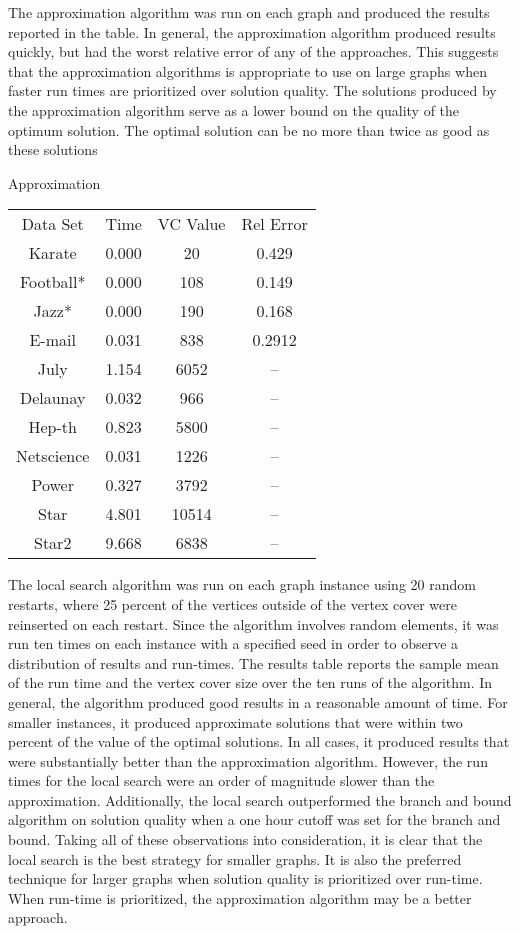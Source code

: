 \documentclass{sig-alternate-05-2015}
\begin{document}
The approximation algorithm was run on each graph and produced the results reported in the table. In general, the approximation algorithm produced results quickly, but had the worst relative error of any of the approaches. This suggests that the approximation algorithms is appropriate to use on large graphs when faster run times are prioritized over solution quality. The solutions produced by the approximation algorithm serve as a lower bound on the quality of the optimum solution. The optimal solution can be no more than twice as good as these solutions

\begin{center}
Approximation
\begin{tabular}{c c c c}
Data Set & Time & VC Value & Rel Error \\
Karate & 0.000 & 20 & 0.429 \\
Football* & 0.000 & 108 & 0.149 \\
Jazz* & 0.000 & 190 & 0.168 \\
E-mail & 0.031 & 838 & 0.2912 \\
July & 1.154 & 6052 & -- \\
Delaunay & 0.032 & 966 & -- \\
Hep-th & 0.823 & 5800 & -- \\
Netscience & 0.031 & 1226 & -- \\
Power & 0.327 & 3792 & -- \\
Star & 4.801 & 10514 & -- \\
Star2 & 9.668 & 6838 & -- \\
\end{tabular}
\end{center}

The local search algorithm was run on each graph instance using 20 random restarts, where 25 percent of the vertices outside of the vertex cover were reinserted on each restart. Since the algorithm involves random elements, it was run ten times on each instance with a specified seed in order to observe a distribution of results and run-times. The results table reports the sample mean of the run time and the vertex cover size over the ten runs of the algorithm. In general, the algorithm produced good results in a reasonable amount of time. For smaller instances, it produced approximate solutions that were within two percent of the value of the optimal solutions. In all cases, it produced results that were substantially better than the approximation algorithm. However, the run times for the local search were an order of magnitude slower than the approximation.  Additionally, the local search outperformed the branch and bound algorithm on solution quality when a one hour cutoff was set for the branch and bound. Taking all of these observations into consideration, it is clear that the local search is the best strategy for smaller graphs. It is also the preferred technique for larger graphs when solution quality is prioritized over run-time. When run-time is prioritized, the approximation algorithm may be a better approach.
\end{document}
